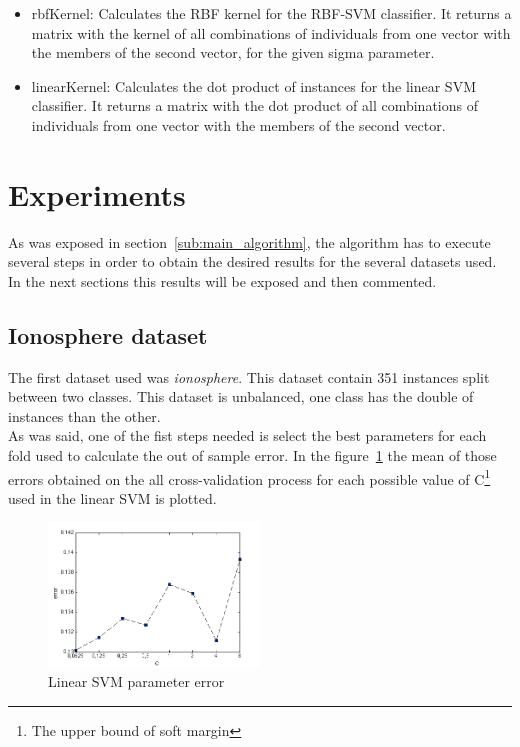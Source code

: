 \documentclass[10pt, journal]{IEEEtran}
\begin{document}
\begin{itemize}
\item rbfKernel: Calculates the RBF kernel for the RBF-SVM classifier. It returns a matrix with the kernel of all combinations of individuals from one vector with the members of the second vector, for the given sigma parameter.
\item linearKernel: Calculates the dot product of instances for the linear SVM classifier. It returns a matrix with the dot product of all combinations of individuals from one vector with the members of the second vector.
\end{itemize}



\section{Experiments} %
\label{sec:experiments}
As was exposed in section~\ref{sub:main_algorithm}, the algorithm has to execute several steps in order to obtain the desired results for the several datasets used. In the next sections this results will be exposed and then commented.

\subsection{Ionosphere dataset} %
\label{sub:ionosphere_dataset}
The first dataset used was \emph{ionosphere}. This dataset contain 351 instances split between two classes. This dataset is unbalanced, one class has the double of instances than the other.\\

As was said, one of the fist steps needed is select the best parameters for each fold used to calculate the out of sample error. In the figure~\ref{fig:errorSVMIonosphere} the mean of those errors obtained on the all cross-validation process for each possible value of C\footnote{The upper bound of soft margin} used in the linear SVM is plotted.\\
\begin{figure}[ht!]
	\centering
	\includegraphics[width=0.5\textwidth]{img/errorSVMIonosphere}
	\caption{Linear SVM parameter error}
	\label{fig:errorSVMIonosphere}
\end{figure}
\end{document}
